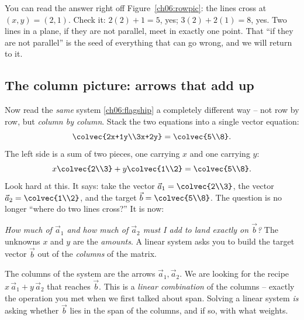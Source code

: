 You can read the answer right off Figure~\ref{ch06:rowpic}: the lines cross
at $(x,y)=(2,1)$. Check it: $2(2)+1=5$, yes; $3(2)+2(1)=8$, yes. Two lines in
a plane, if they are not parallel, meet in exactly one point. That ``if they
are not parallel'' is the seed of everything that can go wrong, and we will
return to it.

\subsection{The column picture: arrows that add up}

Now read the \emph{same} system \eqref{ch06:flagship} a completely different
way -- not row by row, but \emph{column by column}. Stack the two equations
into a single vector equation:
\[
  \colvec{2x+1y\\3x+2y} = \colvec{5\\8}.
\]
The left side is a sum of two pieces, one carrying $x$ and one carrying $y$:
\[
  x\colvec{2\\3} + y\colvec{1\\2} = \colvec{5\\8}.
\]
Look hard at this. It says: take the vector $\vec{a}_1=\colvec{2\\3}$, the
vector $\vec{a}_2=\colvec{1\\2}$, and the target $\vec{b}=\colvec{5\\8}$. The
question is no longer ``where do two lines cross?'' It is now:

\begin{focusbox}
\emph{How much of $\vec{a}_1$ and how much of $\vec{a}_2$ must I add to land
exactly on $\vec{b}$?} The unknowns $x$ and $y$ are the \emph{amounts}. A
linear system asks you to build the target vector $\vec b$ out of the
\emph{columns} of the matrix.
\end{focusbox}

The columns of the system are the arrows $\vec a_1,\vec a_2$. We are looking
for the recipe $x\,\vec a_1 + y\,\vec a_2$ that reaches $\vec b$. This is a
\emph{linear combination} of the columns -- exactly the operation you met
when we first talked about span. Solving a linear system \emph{is} asking
whether $\vec b$ lies in the span of the columns, and if so, with what
weights.

